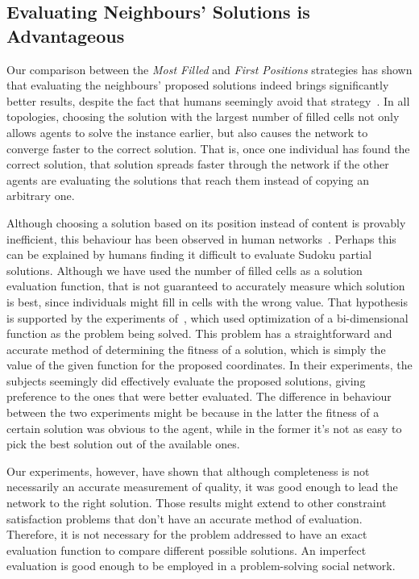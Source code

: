 \documentclass{article}
\begin{document}
\subsection{Evaluating Neighbours' Solutions is Advantageous}

Our comparison between the \emph{Most Filled} and \emph{First Positions} strategies has shown that evaluating the neighbours' proposed solutions indeed brings significantly better results, despite the fact that humans seemingly avoid that strategy~\cite{farenzena:collabem}. In all topologies, choosing the solution with the largest number of filled cells not only allows agents to solve the instance earlier, but also causes the network to converge faster to the correct solution. That is, once one individual has found the correct solution, that solution spreads faster through the network if the other agents are evaluating the solutions that reach them instead of copying an arbitrary one.

Although choosing a solution based on its position instead of content is provably inefficient, this behaviour has been observed in human networks~\cite{farenzena:collabem}. Perhaps this can be explained 
by humans finding it difficult to evaluate Sudoku partial solutions. 
Although we have used the number of filled cells as a solution evaluation function, that is not guaranteed to accurately measure which solution is best, since individuals might fill in cells with the wrong value. That hypothesis is supported by the experiments of~\cite{mason:collablearnet}, which used optimization of a bi-dimensional function as the problem being solved. This problem has a straightforward and accurate method of determining the fitness of a solution, which is simply the value of the given function for the proposed coordinates. In their experiments, the subjects seemingly did effectively evaluate the proposed solutions, giving preference to the ones that were better evaluated. The difference in behaviour between the two experiments might be because in the latter the fitness of a certain solution was obvious to the agent, while in the former it's not as easy to pick the best solution out of the available ones.

Our experiments, however, have shown that although completeness is not necessarily an accurate measurement of quality, it was good enough to lead the network to the right solution.
Those results might extend to other constraint satisfaction problems that don't have an accurate method of evaluation. Therefore, it is not necessary for the problem addressed to have an exact evaluation function to compare different possible solutions. An imperfect evaluation is good enough to be employed in a problem-solving social network.
\end{document}
